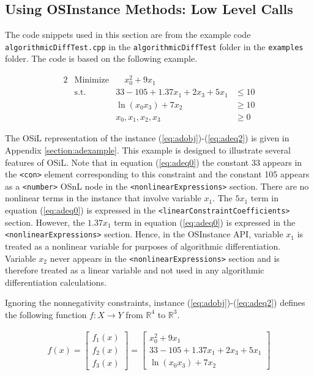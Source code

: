 \documentclass[11pt]{article}
\renewcommand{\_}{{\char"5F}}
\renewcommand{\{}{{\char"7B}}
\renewcommand{\}}{{\char"7D}}
\renewcommand{\^}{{\char"0D}}
\renewcommand{\'}{{\char"0D}}
\begin{document}
 

\subsection{Using OSInstance Methods: Low Level Calls}

  The code snippets used in this section  are from the example code {\tt algorithmicDiffTest.cpp} in the {\tt algorithmicDiffTest} folder in the {\tt examples} folder.  The  code is based on the following example.

\begin{alignat}{2}
& \mbox{Minimize} & \quad  x_{0}^{2} + 9x_{1} \label{eq:adobj}\\
& \mbox{s.t.} & 33 - 105 + 1.37 x_{1} + 2x_{3} + 5 x_{1} &\le 10  \label{eq:adeq0}\\
& & \ln(x_{0} x_{3}) + 7x_{2} &\ge 10 \label{eq:adeq1} \\
& & x_{0}, x_{1}, x_{2}, x_{3} &\ge 0 \label{eq:adeq2}
\end{alignat}

The OSiL representation of the instance  (\ref{eq:adobj})-(\ref{eq:adeq2}) is given in Appendix \ref{section:adexample}.  This example is designed to illustrate several features of OSiL. Note that in equation (\ref{eq:adeq0}) the constant 33 appears in the {\tt <con>} element corresponding to this constraint and the constant 105 appears as a {\tt <number>} OSnL node in the {\tt <nonlinearExpressions>} section.  There are no nonlinear terms in the instance that involve variable $x_{1}.$  The $5 x_{1}$ term in equation (\ref{eq:adeq0}) is expressed in the {\tt <linearConstraintCoefficients>} section.  However,  the $1.37 x_{1}$ term in equation (\ref{eq:adeq0}) is expressed in the {\tt <nonlinearExpressions>} section.  Hence, in the OSInstance API, variable $x_{1}$ is treated as a nonlinear variable for purposes of algorithmic differentiation. Variable $x_{2}$ never appears in the  {\tt <nonlinearExpressions>} section and is therefore treated as a linear variable and not used  in any algorithmic differentiation calculations. 

Ignoring the nonnegativity constraints, instance (\ref{eq:adobj})-(\ref{eq:adeq2})  defines the following function $f:X \rightarrow Y$ from $ \mathbb{R}^{4}$ to $ \mathbb{R}^{3}.$

\begin{eqnarray}
f(x) =
\left[
\begin{array}{r}
f_{1}(x) \\
f_{2}(x) \\
f_{3}(x)
\end{array}
\right]
=
\left[
\begin{array}{r}
x_{0}^{2} + 9x_{1}  \\
33 - 105 + 1.37 x_{1} + 2x_{3} + 5 x_{1} \\
\ln(x_{0} x_{3}) + 7x_{2}
\end{array}
\right] \label{eq:definef}
\end{eqnarray}
\end{document}
